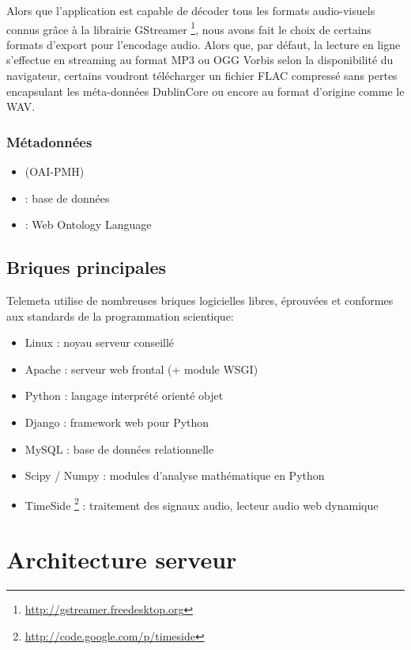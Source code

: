\documentclass[a4paper,11pt,french]{article}
\begin{document}
Alors que l'application est capable de décoder tous les formats audio-visuels connus grâce à la librairie GStreamer \footnote{\url{http://gstreamer.freedesktop.org}}, nous avons fait le choix de certains formats d'export pour l'encodage audio. Alors que, par défaut, la lecture en ligne s'effectue en streaming au format MP3 ou OGG Vorbis selon la disponibilité du navigateur, certains voudront télécharger un fichier FLAC compressé sans pertes encapsulant les méta-données DublinCore ou encore au format d'origine comme le WAV.

\subsubsection{Métadonnées}

    \begin{itemize}
	 \item {} (OAI-PMH)
     \item {} : base de données
     \item {} : Web Ontology Language
    \end{itemize}


\subsection{Briques principales}

Telemeta utilise de nombreuses briques logicielles libres, éprouvées et conformes aux standards de la programmation scientique:

\begin{itemize}
\item Linux : noyau serveur conseillé
\item Apache : serveur web frontal (+ module WSGI)
\item Python : langage interprété orienté objet
\item Django : framework web pour Python
\item MySQL : base de données relationnelle 
\item Scipy / Numpy : modules d'analyse mathématique en Python
\item TimeSide \footnote{\url{http://code.google.com/p/timeside}} : traitement des signaux audio, lecteur audio web dynamique
\end{itemize}


\section{Architecture serveur}
\end{document}
